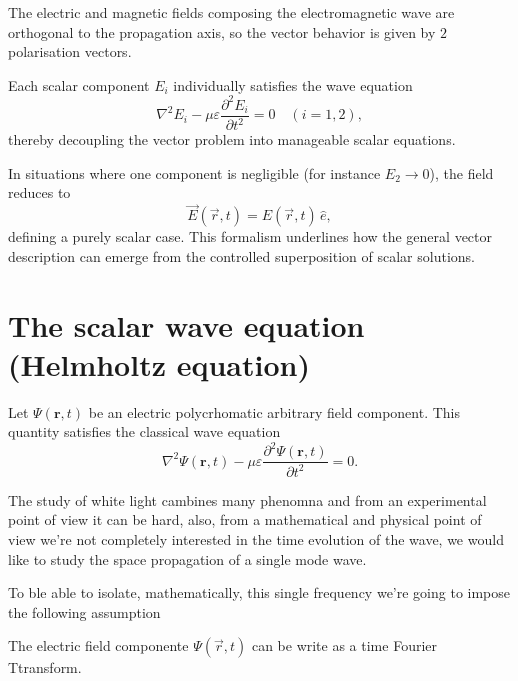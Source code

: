 	\begin{Assumption}
		The electric and magnetic fields composing the electromagnetic wave are orthogonal to the propagation axis, so the vector behavior is given by $2$ polarisation vectors.
	\end{Assumption}

	Each scalar component $E_i$ individually satisfies the wave equation
	\begin{equation}
	\nabla^2 E_i - \mu\varepsilon \frac{\partial^2 E_i}{\partial t^2} = 0 \quad (i=1,2),
	\end{equation}
	thereby decoupling the vector problem into manageable scalar equations.

	In situations where one component is negligible (for instance $E_2 \to 0$), the field reduces to
	\begin{equation}
		\vec{E}(\vec{r},t) = E(\vec{r},t) \, \hat{e},
	\end{equation}
	defining a purely scalar case. This formalism underlines how the general vector description can emerge from the controlled superposition of scalar solutions.

\section{The scalar wave equation (Helmholtz equation)}

	Let $\Psi(\mathbf{r},t)$ be an electric polycrhomatic arbitrary field component. This quantity satisfies the classical wave equation
	\begin{equation}
		\nabla^{2}\Psi(\mathbf{r},t) - \mu\varepsilon \frac{\partial^{2}\Psi(\mathbf{r},t)}{\partial t^{2}} = 0.
		\label{eq.wave.classic}
	\end{equation}

	The study of white light cambines many phenomna and from an experimental point of view it can be hard, also, from a mathematical and physical point of view we're not completely interested in the time evolution of the wave, we would like to study the space propagation of a single mode wave.

	To ble able to isolate, mathematically, this single frequency we're going to impose the following assumption

	\begin{Assumption}
		The electric field componente $\Psi(\vec{r},t)$ can be write as a time Fourier Ttransform.
	\end{Assumption}

